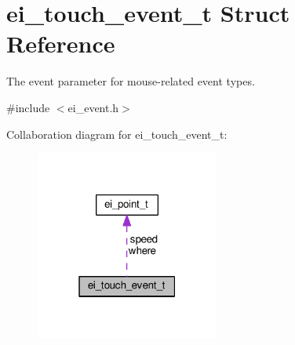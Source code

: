 \hypertarget{structei__touch__event__t}{}\section{ei\+\_\+touch\+\_\+event\+\_\+t Struct Reference}
\label{structei__touch__event__t}


The event parameter for mouse-\/related event types.  




{\ttfamily \#include $<$ei\+\_\+event.\+h$>$}



Collaboration diagram for ei\+\_\+touch\+\_\+event\+\_\+t\+:
\nopagebreak
\begin{figure}[H]
\begin{center}
\leavevmode
\includegraphics[width=171pt]{structei__touch__event__t__coll__graph}
\end{center}
\end{figure}
